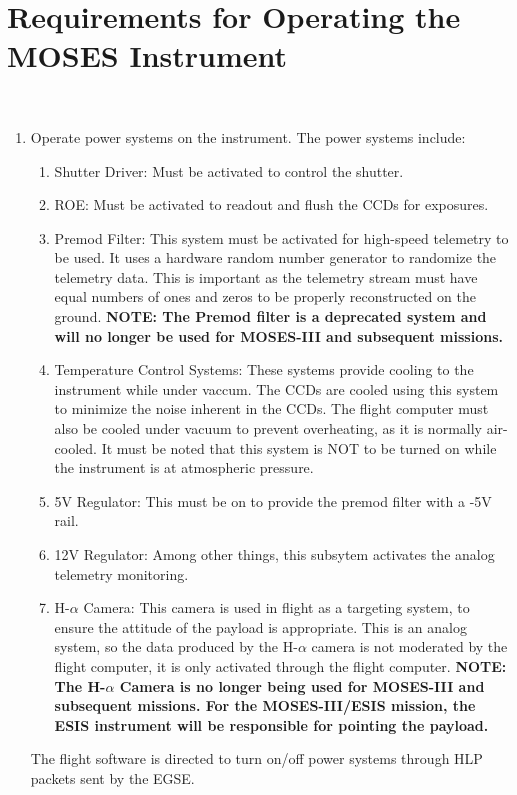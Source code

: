 %
\section{Requirements for Operating the MOSES Instrument}
\hrulefill
\\
\begin{enumerate}
  \item Operate power systems on the instrument. The power systems include: 
	\begin{enumerate}
		\item Shutter Driver: Must be activated to control the shutter.
		\item ROE: Must be activated to readout and flush the CCDs for exposures.
		\item Premod Filter: This system must be activated for high-speed telemetry to be used. It uses a hardware random number generator to randomize the telemetry data. This is important as the telemetry stream must have equal numbers of ones and zeros to be properly reconstructed on the ground. \textbf{NOTE: The Premod filter is a deprecated system and will no longer be used for MOSES-III and subsequent missions.}
		\item Temperature Control Systems: These systems provide cooling to the instrument while under vaccum. The CCDs are cooled using this system to minimize the noise inherent in the CCDs. The flight computer must also be cooled under vacuum to prevent overheating, as it is normally air-cooled. It must be noted that this system is NOT to be turned on while the instrument is at atmospheric pressure.
		\item 5V Regulator: This must be on to provide the premod filter with a -5V rail.
		\item 12V Regulator: Among other things, this subsytem activates the analog telemetry monitoring.
		\item H-$\alpha$ Camera: This camera is used in flight as a targeting system, to ensure the attitude of the payload is appropriate. This is an analog system, so the data produced by the H-$\alpha$ camera is not moderated by the flight computer, it is only activated through the flight computer. \textbf{NOTE: The H-$\alpha$ Camera is no longer being used for MOSES-III and subsequent missions. For the MOSES-III/ESIS mission, the ESIS instrument will be responsible for pointing the payload.}
	\end{enumerate}
The flight software is directed to turn on/off power systems through HLP packets sent by the EGSE.


\end{enumerate}
